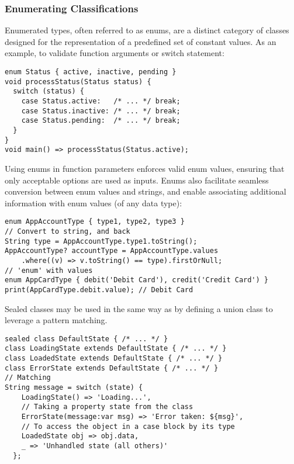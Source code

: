 \newpage
\subsubsection{Enumerating Classifications}

Enumerated types, often referred to as enums, are a distinct category of classes designed for the representation of a
predefined set of constant values. As an example, to validate function arguments or switch statement:

\begin{lstlisting}
enum Status { active, inactive, pending }
void processStatus(Status status) {
  switch (status) {
    case Status.active:   /* ... */ break;
    case Status.inactive: /* ... */ break;
    case Status.pending:  /* ... */ break;
  }
}
void main() => processStatus(Status.active);
\end{lstlisting}

\noindent Using enums in function parameters enforces valid enum values, ensuring that only acceptable options are used
as inputs. Enums also facilitate seamless conversion between enum values and strings, and enable associating additional
information with enum values (of any data type):

\begin{lstlisting}
enum AppAccountType { type1, type2, type3 }
// Convert to string, and back
String type = AppAccountType.type1.toString();
AppAccountType? accountType = AppAccountType.values
    .where((v) => v.toString() == type).firstOrNull;
// 'enum' with values
enum AppCardType { debit('Debit Card'), credit('Credit Card') }
print(AppCardType.debit.value); // Debit Card
\end{lstlisting}

\noindent Sealed classes may be used in the same way as  by defining a union class to leverage a pattern matching.

\begin{lstlisting}
sealed class DefaultState { /* ... */ }
class LoadingState extends DefaultState { /* ... */ }
class LoadedState extends DefaultState { /* ... */ }
class ErrorState extends DefaultState { /* ... */ }
// Matching
String message = switch (state) {
    LoadingState() => 'Loading...',
    // Taking a property state from the class
    ErrorState(message:var msg) => 'Error taken: ${msg}',
    // To access the object in a case block by its type
    LoadedState obj => obj.data,
    _ => 'Unhandled state (all others)'
  };
\end{lstlisting}


